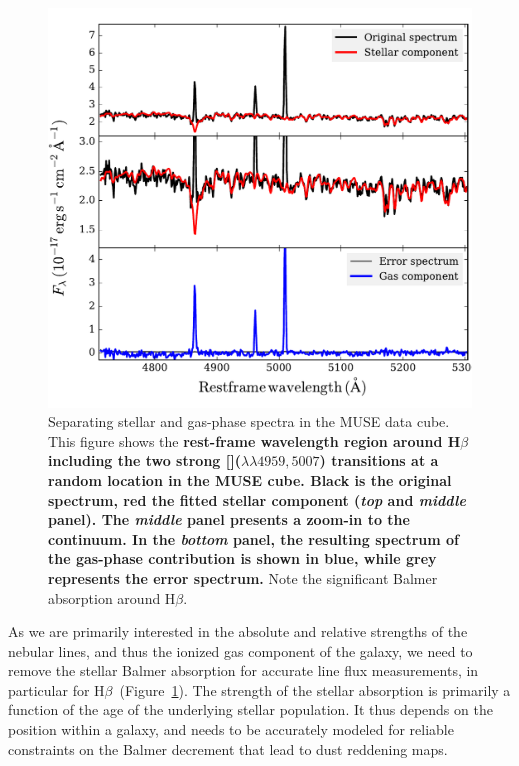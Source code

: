 \documentclass[traditabstract]{aa}
\newcommand{\hb}{H$\beta$}
\newcommand{\oiii}{[\ion{O}{iii}]}
\begin{document}
\begin{figure}
\includegraphics[angle=0, width=0.99\columnwidth]{Figs/Stargas_spec.pdf}
\caption{Separating stellar and gas-phase spectra in the MUSE data cube. This figure shows the \textbf{rest-frame wavelength region around \hb\,including the two strong \oiii($\lambda\lambda4959,5007$) transitions at a random location in the MUSE cube. Black is the original spectrum, red the fitted stellar component (\textit{top} and \textit{middle} panel). The \textit{middle} panel presents a zoom-in to the continuum. In the \textit{bottom} panel, the resulting spectrum of the gas-phase contribution is shown in blue, while grey represents the error spectrum.} Note the significant Balmer absorption around \hb.}
\label{fig:stargas}
\end{figure}

As we are primarily interested in the absolute and relative strengths of the nebular lines, and thus the ionized gas component of the galaxy, we need to remove the stellar Balmer absorption for accurate line flux measurements, in particular for \hb\, (Figure~\ref{fig:stargas}). The strength of the stellar absorption is primarily a function of the age of the underlying stellar population. It thus depends on the position within a galaxy, and needs to be accurately modeled for reliable constraints on the Balmer decrement that lead to dust reddening maps.
\end{document}
